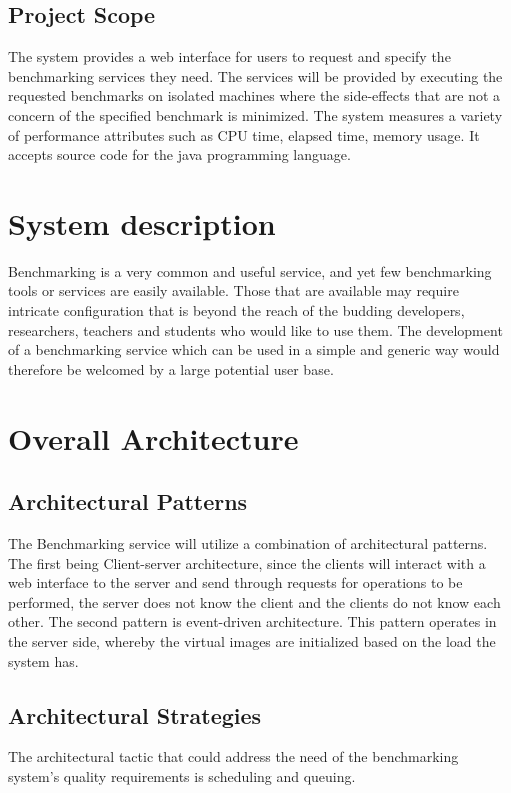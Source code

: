 \documentclass[runningheads,a4paper]{article}
\begin{document}
\subsection{Project Scope}
The system provides a web interface for users to request and specify the benchmarking services they need. The services will be provided by executing the requested benchmarks on isolated machines where the side-effects that are not a concern of the specified benchmark is minimized. The system measures a variety of performance attributes such as CPU time, elapsed time, memory usage. It accepts source code for the java programming language. 


\section{System description}
Benchmarking is a very common and useful service, and yet few benchmarking tools or services are easily available. Those that are available may require intricate configuration that is beyond the reach of the budding developers, researchers, teachers and students who would like to use them. The development of a benchmarking service which can be used in a simple and generic way would therefore be welcomed by a large potential user base.

\section{Overall Architecture}
\subsection{Architectural Patterns}
The Benchmarking service will utilize a combination of architectural patterns. The first being Client-server architecture, since the clients will interact with a web interface to the server and send through requests for operations to be performed, the server does not know the client and the clients do not know each other. The second pattern is event-driven architecture. This pattern operates in the server side, whereby the virtual images are initialized based on the load the system has.\\

\subsection{Architectural Strategies}
The architectural tactic that could address the need of the benchmarking system's quality requirements is scheduling and queuing.
\end{document}

